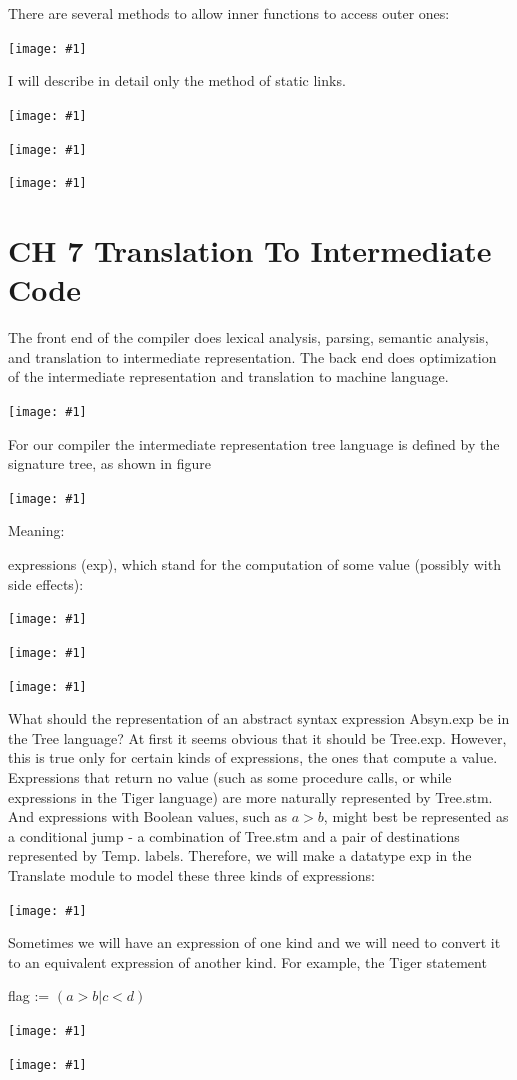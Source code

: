 \documentclass[8pt, a4paper, oneside, twocolumn]{extarticle}
\newcommand{\ph}[1]{
    \texttt{[image: \#1]}
}
\begin{document}
There are several methods to allow inner functions to access outer ones:

\ph{r13}

I will describe in detail only the method of static links.

\ph{arpb}

\ph{r14}

\ph{r15}


\section{CH 7 Translation To Intermediate Code}
The front end of the compiler does lexical analysis, parsing,
semantic analysis, and translation to intermediate representation. The back
end does optimization of the intermediate representation and translation to
machine language.

\ph{ir1}

For our compiler the intermediate representation tree language is defined by the signature tree, as shown in figure

\ph{ir2}

Meaning:

expressions (exp), which stand for the computation of some value (possibly
with side effects):

\ph{ir3}

\ph{ir4}

\ph{ir5}

What should the representation of an abstract syntax expression Absyn.exp
be in the Tree language? At first it seems obvious that it should be Tree.exp.
However, this is true only for certain kinds of expressions, the ones that 
compute a value. Expressions that return no value (such as some procedure calls,
or while expressions in the Tiger language) are more naturally represented
by Tree.stm. And expressions with Boolean values, such as $a > b$, might
best be represented as a conditional jump - a combination of Tree.stm and
a pair of destinations represented by Temp. labels.
Therefore, we will make a datatype exp in the Translate module to
model these three kinds of expressions:

\ph{ir6}

Sometimes we will have an expression of one kind and we will need to
convert it to an equivalent expression of another kind. For example, the Tiger
statement

flag := $(a>b \vert c<d)$

\ph{ir7}

\ph{ir8}
\end{document}
